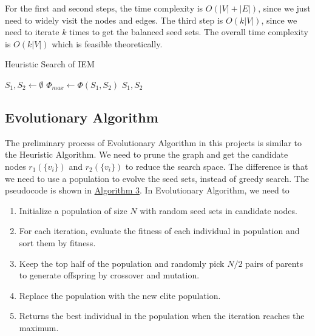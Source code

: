 \documentclass{article}
\begin{document}
For the first and second steps, the time complexity is $O(|V| + |E|)$, since we just need to widely visit the nodes and edges. The third step is $O(k|V|)$, since we need to iterate $k$ times to get the balanced seed sets. The overall time complexity is $O(k|V|)$ which is feasible theoretically.

\begin{algorithm}
\caption{Heuristic Search of IEM}\label{alg:heuristic}
$S_1, S_2 \leftarrow \emptyset$\;
$\Phi_{max} \leftarrow \Phi \left( S_1, S_2 \right)$\;
\Return $S_1, S_2$\;
\end{algorithm}

\subsection{Evolutionary Algorithm}
The preliminary process of Evolutionary Algorithm in this projects is similar to the Heuristic Algorithm. We need to prune the graph and get the candidate nodes $r_1(\{v_i\})$ and $r_2(\{v_i\})$ to reduce the search space. The difference is that we need to use a population to evolve the seed sets, instead of greedy search. The pseudocode is shown in \hyperlink{alg:evolutionary}{Algorithm 3}. In Evolutionary Algorithm, we need to

\begin{enumerate}
    \item Initialize a population of size $N$ with random seed sets in candidate nodes.
    \item For each iteration, evaluate the fitness of each individual in population and sort them by fitness.
    \item Keep the top half of the population and randomly pick $N/2$ pairs of parents to generate offspring by crossover and mutation.
    \item Replace the population with the new elite population.
    \item Returns the best individual in the population when the iteration reaches the maximum.
\end{enumerate}
\end{document}
